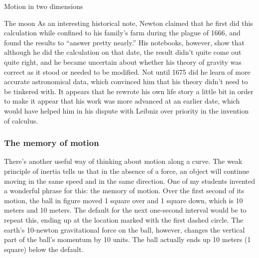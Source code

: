 \begin{envsubsection}{Motion in two dimensions}
\begin{eg}{The moon}
As an interesting historical note, Newton claimed that he first did this
calculation while confined to his family's farm during the plague of 1666, and
found the results to ``answer pretty nearly.''
His notebooks, however, show that although he did the calculation on that date,
the result didn't quite come out quite right, and he became uncertain about
whether his theory of gravity was correct as it stood or needed to be modified.
Not until 1675 did he learn of more accurate astronomical data, which convinced
him that his theory didn't need to be tinkered with.
It appears that he rewrote his own life story a little bit
in order to make it appear that his work was more advanced at an earlier
date, which would have helped him in his dispute with Leibniz over priority
in the invention of calculus.
\end{eg}

\subsubsection{The memory of motion}
There's another useful way of thinking about motion
along a curve.
The weak principle of inertia tells us that in the absence of a force, an
object will continue moving in the same speed and in the same direction. One of my students
invented a wonderful phrase for this: the memory of motion. 
Over the first second of its motion, the ball in figure
 moved 1 square over and 1 square down, which is 10 meters and
10 meters. The default for the next one-second
interval would be to repeat this, ending up at the location marked with the 
first dashed circle. The earth's 10-newton gravitational force on the ball, however, changes
the vertical part of the ball's momentum by 10 units. The ball actually ends up 10 meters
(1 square) below the default.

\vfill\pagebreak[4]


\end{envsubsection}
